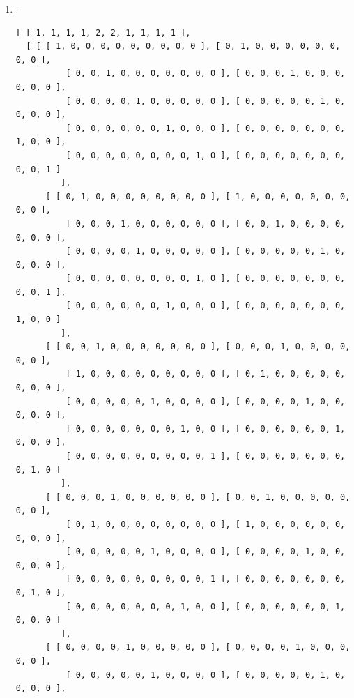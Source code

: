 \documentclass[a4paper, 10pt]{book}
\theoremstyle{definition}
\numberwithin{equation}{chapter}
\begin{document}
\begin{appendices}
\begin{enumerate}
\begin{lstlisting}[numbers=none]
          [ 0, 0, 1, 0, 0, 0, 1 ] ], 
      [ [ 0, 0, 0, 0, 1, 0, 0 ], [ 0, 0, 0, 0, 0, 1, 0 ], 
          [ 0, 0, 0, 0, 0, 0, 1 ], [ 0, 0, 0, 1, 0, 0, 0 ], 
          [ 0, 1, 0, 0, 0, 0, 0 ], [ 1, 0, 0, 0, 0, 0, 0 ], 
          [ 0, 0, 1, 0, 0, 0, 0 ] ], 
      [ [ 0, 0, 0, 0, 0, 1, 0 ], [ 0, 0, 0, 0, 1, 0, 0 ], 
          [ 0, 0, 0, 0, 0, 0, 1 ], [ 0, 0, 0, 1, 0, 0, 0 ], 
          [ 1, 0, 0, 0, 0, 0, 0 ], [ 0, 1, 0, 0, 0, 0, 0 ], 
          [ 0, 0, 1, 0, 0, 0, 0 ] ], 
      [ [ 0, 0, 0, 0, 0, 0, 1 ], [ 0, 0, 0, 0, 0, 0, 1 ], 
          [ 0, 0, 0, 1, 1, 1, 0 ], [ 0, 0, 1, 0, 0, 0, 1 ], 
          [ 0, 0, 1, 0, 0, 0, 0 ], [ 0, 0, 1, 0, 0, 0, 0 ], 
          [ 1, 1, 0, 1, 0, 0, 0 ] ] ] ]
	\end{lstlisting}
	\item -\begin{lstlisting}[numbers=none]
	[ [ 1, 1, 1, 1, 2, 2, 1, 1, 1, 1 ], 
  [ [ [ 1, 0, 0, 0, 0, 0, 0, 0, 0, 0 ], [ 0, 1, 0, 0, 0, 0, 0, 0, 0, 0 ], 
          [ 0, 0, 1, 0, 0, 0, 0, 0, 0, 0 ], [ 0, 0, 0, 1, 0, 0, 0, 0, 0, 0 ],
          [ 0, 0, 0, 0, 1, 0, 0, 0, 0, 0 ], [ 0, 0, 0, 0, 0, 1, 0, 0, 0, 0 ],
          [ 0, 0, 0, 0, 0, 0, 1, 0, 0, 0 ], [ 0, 0, 0, 0, 0, 0, 0, 1, 0, 0 ],
          [ 0, 0, 0, 0, 0, 0, 0, 0, 1, 0 ], [ 0, 0, 0, 0, 0, 0, 0, 0, 0, 1 ] 
         ], 
      [ [ 0, 1, 0, 0, 0, 0, 0, 0, 0, 0 ], [ 1, 0, 0, 0, 0, 0, 0, 0, 0, 0 ], 
          [ 0, 0, 0, 1, 0, 0, 0, 0, 0, 0 ], [ 0, 0, 1, 0, 0, 0, 0, 0, 0, 0 ],
          [ 0, 0, 0, 0, 1, 0, 0, 0, 0, 0 ], [ 0, 0, 0, 0, 0, 1, 0, 0, 0, 0 ],
          [ 0, 0, 0, 0, 0, 0, 0, 0, 1, 0 ], [ 0, 0, 0, 0, 0, 0, 0, 0, 0, 1 ],
          [ 0, 0, 0, 0, 0, 0, 1, 0, 0, 0 ], [ 0, 0, 0, 0, 0, 0, 0, 1, 0, 0 ] 
         ], 
      [ [ 0, 0, 1, 0, 0, 0, 0, 0, 0, 0 ], [ 0, 0, 0, 1, 0, 0, 0, 0, 0, 0 ], 
          [ 1, 0, 0, 0, 0, 0, 0, 0, 0, 0 ], [ 0, 1, 0, 0, 0, 0, 0, 0, 0, 0 ],
          [ 0, 0, 0, 0, 0, 1, 0, 0, 0, 0 ], [ 0, 0, 0, 0, 1, 0, 0, 0, 0, 0 ],
          [ 0, 0, 0, 0, 0, 0, 0, 1, 0, 0 ], [ 0, 0, 0, 0, 0, 0, 1, 0, 0, 0 ],
          [ 0, 0, 0, 0, 0, 0, 0, 0, 0, 1 ], [ 0, 0, 0, 0, 0, 0, 0, 0, 1, 0 ] 
         ], 
      [ [ 0, 0, 0, 1, 0, 0, 0, 0, 0, 0 ], [ 0, 0, 1, 0, 0, 0, 0, 0, 0, 0 ], 
          [ 0, 1, 0, 0, 0, 0, 0, 0, 0, 0 ], [ 1, 0, 0, 0, 0, 0, 0, 0, 0, 0 ],
          [ 0, 0, 0, 0, 0, 1, 0, 0, 0, 0 ], [ 0, 0, 0, 0, 1, 0, 0, 0, 0, 0 ],
          [ 0, 0, 0, 0, 0, 0, 0, 0, 0, 1 ], [ 0, 0, 0, 0, 0, 0, 0, 0, 1, 0 ],
          [ 0, 0, 0, 0, 0, 0, 0, 1, 0, 0 ], [ 0, 0, 0, 0, 0, 0, 1, 0, 0, 0 ] 
         ], 
      [ [ 0, 0, 0, 0, 1, 0, 0, 0, 0, 0 ], [ 0, 0, 0, 0, 1, 0, 0, 0, 0, 0 ], 
          [ 0, 0, 0, 0, 0, 1, 0, 0, 0, 0 ], [ 0, 0, 0, 0, 0, 1, 0, 0, 0, 0 ],

\end{lstlisting}
\end{enumerate}
\end{appendices}
\end{document}
